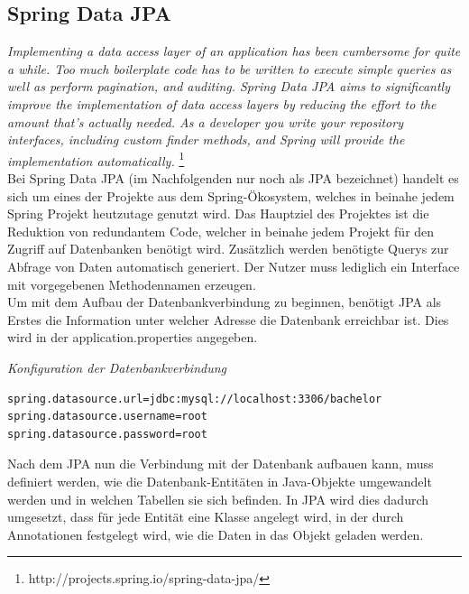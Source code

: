 \subsection{Spring Data JPA}

\emph{\glqq   
Implementing a data access layer of an application has been cumbersome for quite a while. Too much boilerplate code has to be written to execute simple queries as well as perform pagination, and auditing. Spring Data JPA aims to significantly improve the implementation of data access layers by reducing the effort to the amount that’s actually needed. As a developer you write your repository interfaces, including custom finder methods, and Spring will provide the implementation automatically.
\grqq} \footnote{http://projects.spring.io/spring-data-jpa/} \\

Bei Spring Data JPA (im Nachfolgenden nur noch als JPA bezeichnet) handelt es sich um eines der Projekte aus dem Spring-Ökosystem, welches in beinahe jedem Spring Projekt heutzutage genutzt wird. Das Hauptziel des Projektes ist die Reduktion von redundantem Code, welcher in beinahe jedem Projekt für den Zugriff auf Datenbanken benötigt wird. Zusätzlich werden benötigte Querys zur Abfrage von Daten automatisch generiert. Der Nutzer muss lediglich ein Interface mit vorgegebenen Methodennamen erzeugen. \\

Um mit dem Aufbau der Datenbankverbindung zu beginnen, benötigt JPA als Erstes die Information unter welcher Adresse die Datenbank erreichbar ist. Dies wird in der application.properties angegeben. \\

\begin{minipage}{\textwidth}
\emph{Konfiguration der Datenbankverbindung}
\begin{lstlisting}
spring.datasource.url=jdbc:mysql://localhost:3306/bachelor
spring.datasource.username=root
spring.datasource.password=root
\end{lstlisting} 
\end{minipage}

Nach dem JPA nun die Verbindung mit der Datenbank aufbauen kann, muss definiert werden, wie die Datenbank-Entitäten in Java-Objekte umgewandelt werden und in welchen Tabellen sie sich befinden. In JPA wird dies dadurch umgesetzt, dass für jede Entität eine Klasse angelegt wird, in der durch Annotationen festgelegt wird, wie die Daten in das Objekt geladen werden. \\

